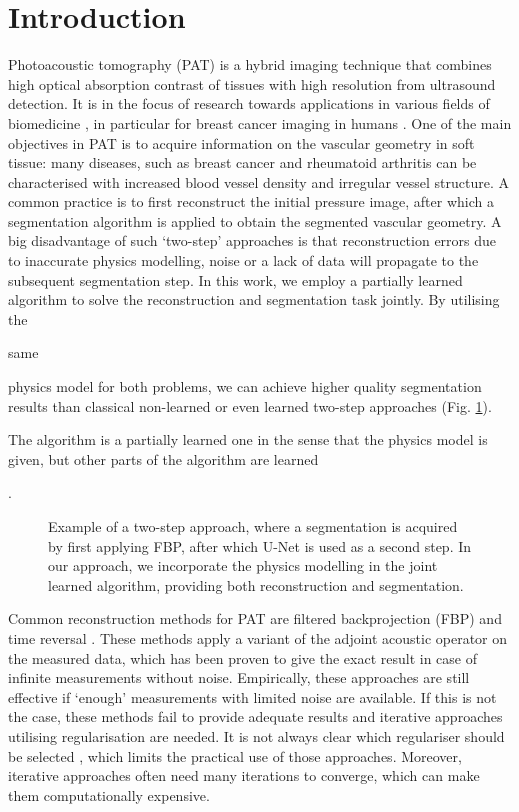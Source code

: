 \documentclass[journal]{IEEEtran}
\newcommand{\hl}[1]{\cbcolor{red}\begin{changebar}{\color{red} #1}\end{changebar}}
\begin{document}
\IEEEpeerreviewmaketitle
\vspace{-3mm}
\section{Introduction}
Photoacoustic tomography (PAT) is a hybrid imaging technique that combines high optical absorption contrast of tissues with high resolution from ultrasound detection. It is in the focus of research towards applications in various fields of biomedicine \cite{Zhou2016}, in particular for breast cancer imaging in humans \cite{Heijblom2015, Toi2017, Lin2018}. One of the main objectives in PAT is to acquire information on the vascular geometry in soft tissue: many diseases, such as breast cancer and rheumatoid arthritis can be characterised with increased blood vessel density and irregular vessel structure. A common practice is to first reconstruct the initial pressure image, after which a segmentation algorithm is applied to obtain the segmented vascular geometry. A big disadvantage of such `two-step' approaches is that reconstruction errors due to inaccurate physics modelling, noise or a lack of data will propagate to the subsequent segmentation step. In this work, we employ a partially learned algorithm to solve the reconstruction and segmentation task jointly. By utilising the \hl{same} physics model for both problems, we can achieve higher quality segmentation results than classical non-learned or even learned two-step approaches (Fig. \ref{fig:UNet_vs_LPD}). \hl{The algorithm is a partially learned one in the sense that the physics model is given, but other parts of the algorithm are learned}.

\begin{figure}[!ht]
\resizebox{\linewidth}{!}{%
\begin{tikzpicture}

\end{tikzpicture}}
\caption{Example of a two-step approach, where a segmentation is acquired by first applying FBP, after which U-Net is used as a second step. In our approach, we incorporate the physics modelling in the joint learned algorithm, providing both reconstruction and segmentation.}
\label{fig:UNet_vs_LPD}
\vspace{-3mm}
\end{figure}

Common reconstruction methods for PAT are filtered backprojection (FBP) \cite{Kruger1995, Finch2004, Willemink2010, Haltmeier2014} and time reversal \cite{Burgholzer2007, Treeby2010}. These methods apply a variant of the adjoint acoustic operator on the measured data, which has been proven to give the exact result in case of infinite measurements without noise. Empirically, these approaches are still effective if `enough' measurements with limited noise are available. If this is not the case, these methods fail to provide adequate results and iterative approaches utilising regularisation \cite{Dean-Ben2012a, Huang2013, Arridge2016a, Arridge2016b, Boink2018, Nguyen2018, Frikel2018} are needed. It is not always clear which regulariser should be selected \cite{Boink2018}, which limits the practical use of those approaches. Moreover, iterative approaches often need many iterations to converge, which can make them computationally expensive.
\end{document}

